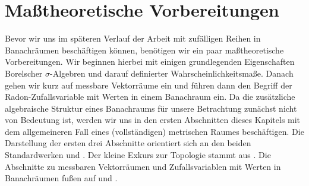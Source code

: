 \chapter{Ma\ss theoretische Vorbereitungen}
Bevor wir uns im späteren Verlauf der Arbeit mit zufälligen Reihen in Banachräumen beschäftigen können, benötigen wir ein paar maßtheoretische Vorbereitungen. 
Wir beginnen hierbei mit einigen grundlegenden Eigenschaften Borelscher $\sigma$-Algebren und darauf definierter Wahrscheinlichkeitsmaße. 
Danach gehen wir kurz auf messbare Vektorräume ein und führen dann den Begriff der Radon-Zufallsvariable mit Werten in einem Banachraum ein. 
Da die zusätzliche algebraische Struktur eines Banachraums für unsere Betrachtung zunächst nicht von Bedeutung ist, 
werden wir uns in den ersten Abschnitten dieses Kapitels mit dem allgemeineren Fall eines (vollständigen) metrischen Raumes beschäftigen. 
Die Darstellung der ersten drei Abschnitte orientiert sich an den beiden Standardwerken \cite{parthasarathy} und \cite{billingsley}. Der kleine Exkurs zur Topologie stammt aus \cite{preuss}. 
Die Abschnitte zu messbaren Vektorräumen und Zufallsvariablen mit Werten in Banachräumen fußen auf \cite{vakhania} und \cite{ledoux-talagrand}. 










